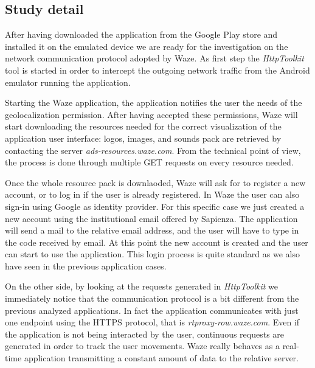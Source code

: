 	\subsection{Study detail}
		\par After having downloaded the application from the Google Play store and installed it on the emulated device we are ready for the investigation on the network communication protocol adopted by Waze. \newline
		As first step the \textit{HttpToolkit} tool is started in order to intercept the outgoing network traffic from the Android emulator running the application. \newline
		\par Starting the Waze application, the application notifies the user the needs of the geolocalization permission. After having accepted these permissions, Waze will start downloading the resources needed for the correct visualization of the application user interface: logos, images, and sounds pack are retrieved by contacting the server \textit{ads-resources.waze.com}. From the technical point of view, the process is done through multiple GET requests on every resource needed. \newline
		\par Once the whole resource pack is downlaoded, Waze will ask for to register a new account, or to log in if the user is already registered. In Waze the user can also sign-in using Google as identity provider. For this specific case we just created a new account using the institutional email offered by Sapienza. The application will send a mail to the relative email address, and the user will have to type in the code received by email. At this point the new account is created and the user can start to use the application. This login process is quite standard as we also have seen in the previous application cases. \newline
		\par  On the other side, by looking at the requests generated in \textit{HttpToolkit} we immediately notice that the communication protocol is a bit different from the previous analyzed applications. In fact the application communicates with just one endpoint using the HTTPS protocol, that is \textit{rtproxy-row.waze.com}. Even if the application is not being interacted by the user, continuous requests are generated in order to track the user movements. Waze really behaves as a real-time application transmitting a constant amount of data to the relative server. \newline
